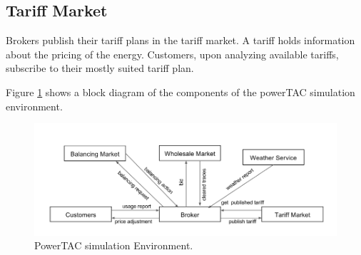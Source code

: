 \subsection{Tariff Market}
Brokers publish their tariff plans in the tariff market. A tariff holds information about the pricing of the energy. Customers, upon analyzing available tariffs, subscribe to their mostly suited tariff plan.

Figure \ref{fig:simulation-environment}  shows a block diagram of the components of the powerTAC simulation environment.

\begin{figure}[h!]
  \includegraphics[width=\linewidth]{simulation-environment.png}
  \caption{PowerTAC simulation Environment.}
  \label{fig:simulation-environment}
\end{figure}


